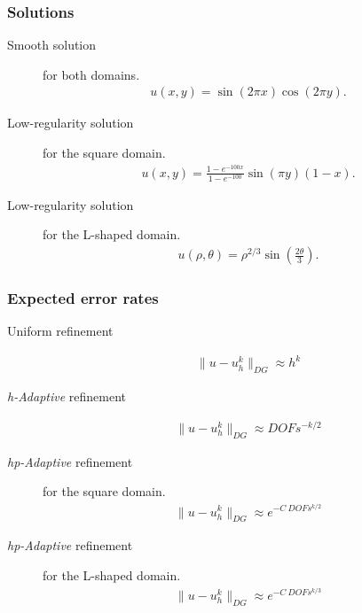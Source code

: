 \begin{frame}
    \frametitle{Solutions}

    \begin{description}
        \item[Smooth solution] for both domains.
            \begin{gather}
                u(x, y) = \sin(2 \pi x) \cos(2 \pi y).
            \end{gather}
        \item[Low-regularity solution] for the square domain. 
            \begin{gather}
                u(x, y) = \frac{1 - e^{-100x}}{1 - e^{-100}} \sin(\pi y) (1 - x).
            \end{gather}
        \item[Low-regularity solution] for the L-shaped domain.
            \begin{gather}
                u(\rho, \theta) = \rho^{2 / 3} \sin\left(\frac{2 \theta}{3}\right).
            \end{gather}
    \end{description}
\end{frame}

\begin{frame}
    \frametitle{Expected error rates}

    \begin{description}
        \item[Uniform refinement]
            \begin{gather}
                \lVert u - u_h^k \rVert_{DG} \approx h^{k} \label{uniform_trend}
            \end{gather}
        \item[\textit{h-Adaptive} refinement]
            \begin{gather}
                \lVert u - u_h^k \rVert_{DG} \approx DOFs^{-k/2} \label{h_trend}
            \end{gather}
        \item[\textit{hp-Adaptive} refinement] for the square domain.
            \begin{gather}
                \lVert u - u_h^k \rVert_{DG} \approx e^{-C ~ DOFs^{k/2}} \label{square_hp_trend}
            \end{gather}
        \item[\textit{hp-Adaptive} refinement] for the L-shaped domain.
            \begin{gather}
                \lVert u - u_h^k \rVert_{DG} \approx e^{-C ~ DOFs^{k/3}} \label{lshape_hp_trend}
            \end{gather}
    \end{description}
\end{frame}

